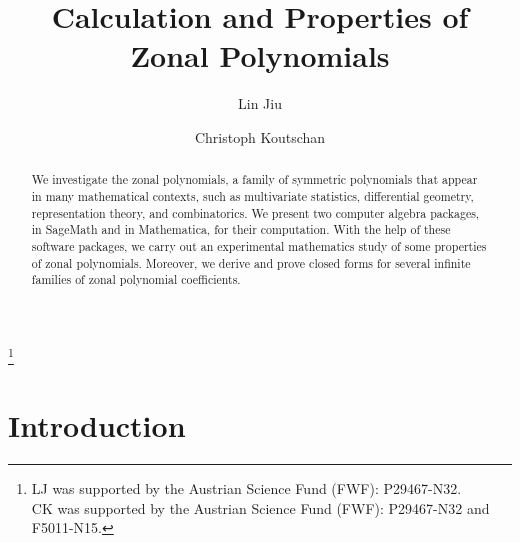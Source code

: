 \documentclass{mathincs}
\numberwithin{equation}{section}
\numberwithin{figure}{section}
\theoremstyle{plain}
\theoremstyle{definition}
\theoremstyle{remark}
\theoremstyle{plain}
\theoremstyle{definition}
\theoremstyle{plain}
\theoremstyle{plain}
\begin{document}
\title{Calculation and Properties of Zonal Polynomials}

\author{Lin Jiu}
\address{%
Department of Mathematics and Statistics,
Dalhousie University,
6316 Coburg Road, Halifax, Nova Scotia, Canada B3H 4R2 
}
\thanks{%
LJ was supported by the Austrian Science Fund (FWF): P29467-N32.\\
CK was supported by the Austrian Science Fund (FWF): P29467-N32 and F5011-N15.
}

\author{Christoph Koutschan}
\address{%
Johann Radon Institute for Computational and Applied Mathematics (RICAM),
Austrian Academy of Sciences,
Altenberger Stra\ss e 69, A-4040 Linz, Austria
}




\begin{abstract}
  We investigate the zonal polynomials, a family of symmetric polynomials that
  appear in many mathematical contexts, such as multivariate statistics,
  differential geometry, representation theory, and combinatorics.  We present
  two computer algebra packages, in SageMath and in Mathematica, for their
  computation. With the help of these software packages, we carry out an experimental
  mathematics study of some properties of zonal polynomials. Moreover, we
  derive and prove closed forms for several infinite families of zonal
  polynomial coefficients.
\end{abstract}

\maketitle

\section{Introduction}
\end{document}
